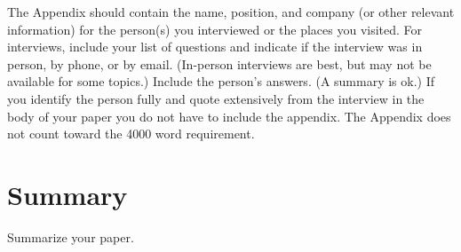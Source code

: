 \documentclass[journal]{IEEEtran}
\begin{document}
\appendix
The Appendix should contain the name, position, and company (or other relevant information) for the person(s) you interviewed or the places you visited. For interviews, include your list of questions and indicate if the interview was in person, by phone, or by email. (In-person interviews are best, but may not be available for some topics.) Include the person's answers. (A summary is ok.) If you identify the person fully and quote extensively from the interview in the body of your paper you do not have to include the appendix. The Appendix does not count toward the 4000 word requirement.


\section{Summary}
Summarize your paper.
\end{document}

